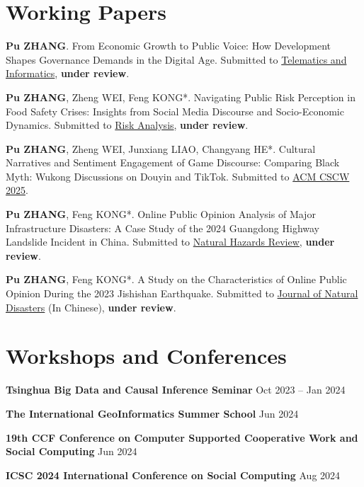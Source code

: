 \documentclass[letterpaper, 11pt]{article}
\newcommand{\sepspace}{\vspace{0.5em}}
\begin{document}
\begingroup
\setlength{\parskip}{0pt}
\nocite{*}
\printbibliography[heading=none]
\endgroup

\section{Working Papers}

\textbf{Pu ZHANG}. From Economic Growth to Public Voice: How Development Shapes Governance Demands in the Digital Age. Submitted to \href{https://www.sciencedirect.com/journal/telematics-and-informatics}{Telematics and Informatics}, \textbf{under review}.
\sepspace

\textbf{Pu ZHANG}, Zheng WEI, Feng KONG*. Navigating Public Risk Perception in Food Safety Crises: Insights from Social Media Discourse and Socio-Economic Dynamics. Submitted to \href{https://onlinelibrary.wiley.com/journal/15396924}{Risk Analysis}, \textbf{under review}.
\sepspace

\textbf{Pu ZHANG}, Zheng WEI, Junxiang LIAO, Changyang HE*. Cultural Narratives and Sentiment Engagement of Game Discourse: Comparing Black Myth: Wukong Discussions on Douyin and TikTok. Submitted to \href{https://cscw.acm.org/2025/}{ACM CSCW 2025}.

\sepspace
\textbf{Pu ZHANG}, Feng KONG*. Online Public Opinion Analysis of Major Infrastructure Disasters: A Case Study of the 2024 Guangdong Highway Landslide Incident in China. Submitted to \href{https://ascelibrary.org/journal/nhrefo}{Natural Hazards Review}, \textbf{under review}.

\sepspace
\textbf{Pu ZHANG}, Feng KONG*. A Study on the Characteristics of Online Public Opinion During the 2023 Jishishan Earthquake. Submitted to {\href{https://zrzh.paperonce.org/#/}{Journal of Natural Disasters}} (In Chinese), \textbf{under review}.

\section{Workshops and Conferences}
\textbf{Tsinghua Big Data and Causal Inference Seminar} \hfill Oct 2023 -- Jan 2024

\sepspace
\textbf{The International GeoInformatics Summer School} \hfill Jun 2024

\sepspace
\textbf{19th CCF Conference on Computer Supported Cooperative Work and Social Computing} \hfill Jun 2024

\sepspace
\textbf{ICSC 2024 International Conference on Social Computing} \hfill Aug 2024
\end{document}
